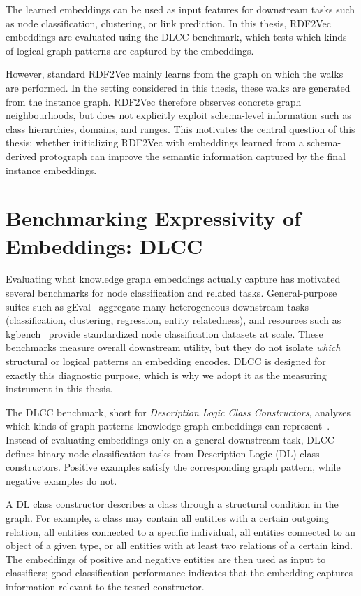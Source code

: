 \documentclass[a4paper,oneside,bibliography=totoc]{scrbook}
\begin{document}
The learned embeddings can be used as input features for downstream tasks such
as node classification, clustering, or link prediction. In this thesis, RDF2Vec
embeddings are evaluated using the DLCC benchmark, which tests which kinds of
logical graph patterns are captured by the embeddings.

However, standard RDF2Vec mainly learns from the graph on which the walks are
performed. In the setting considered in this thesis, these walks are generated
from the instance graph. RDF2Vec therefore observes concrete graph
neighbourhoods, but does not explicitly exploit schema-level information such as
class hierarchies, domains, and ranges. This motivates the central question of
this thesis: whether initializing RDF2Vec with embeddings learned from a
schema-derived protograph can improve the semantic information captured by the
final instance embeddings.

\section{Benchmarking Expressivity of Embeddings: DLCC}
\label{sec:lit_dlcc}

Evaluating what knowledge graph embeddings actually capture has motivated
several benchmarks for node classification and related tasks. General-purpose
suites such as gEval~\cite{pellegrino_configurable_2019,pellegrino_geval_2020} aggregate many heterogeneous
downstream tasks (classification, clustering, regression, entity relatedness),
and resources such as kgbench~\cite{bloem_kgbench_2021} provide standardized
node classification datasets at scale. These benchmarks measure overall
downstream utility, but they do not isolate \emph{which} structural or logical
patterns an embedding encodes. DLCC is designed for exactly this diagnostic
purpose, which is why we adopt it as the measuring instrument in this thesis.

The DLCC benchmark, short for \emph{Description Logic Class Constructors},
analyzes which kinds of graph patterns knowledge graph embeddings can
represent~\cite{portisch_dlcc_2022}. Instead of evaluating embeddings only on
a general downstream task, DLCC defines binary node classification tasks from
Description Logic (DL) class constructors. Positive examples satisfy the
corresponding graph pattern, while negative examples do not.

A DL class constructor describes a class through a structural condition in the
graph. For example, a class may contain all entities with a certain outgoing
relation, all entities connected to a specific individual, all entities
connected to an object of a given type, or all entities with at least two
relations of a certain kind. The embeddings of positive and negative entities
are then used as input to classifiers; good classification performance
indicates that the embedding captures information relevant to the tested
constructor.
\end{document}
